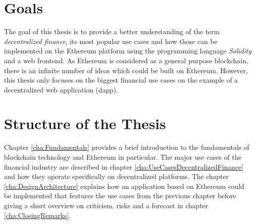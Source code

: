 \section{Goals}
The goal of this thesis is to provide a better understanding of the term \textit{decentralized finance}, its most popular use cases and
how those can be implemented on the Ethereum platform using the programming language \textit{Solidity} and a web frontend. As Ethereum is considered
as a general purpose blockchain, there is an infinite number of ideas which could be built on Ethereum. However, this thesis only focuses on the
biggest financial use cases on the example of a decentralized web application (dapp).

\section{Structure of the Thesis}
Chapter \ref{cha:Fundamentals} provides a brief introduction to the fundamentals of blockchain technology and Ethereum in particular. The major use cases of the
financial industry are described in chapter \ref{cha:UseCasesDecentralizedFinance} and how they operate specifically on decentralized
platforms. The chapter \ref{cha:DesignArchitecture} explains how an application based on Ethereum could be implemented that features
the use cases from the previous chapter before giving a short overview on criticism, risks and a forecast in chapter
\ref{cha:ClosingRemarks}.